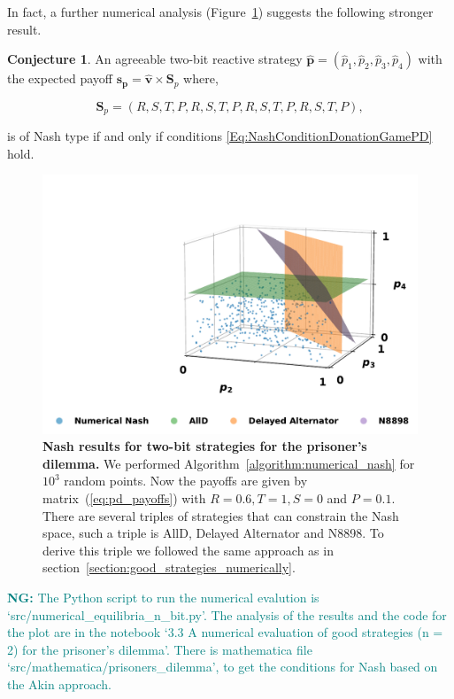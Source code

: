 \documentclass{article}
\theoremstyle{definition}
\newtheorem{conjecture}[theorem]{Conjecture}
\newcommand{\nikoleta}[1]{\textcolor{teal}{{\bf NG:} #1}}
\begin{document}
In fact, a further numerical analysis (Figure~\ref{fig:numerical_results_prisoners_dilemma}) suggests the following stronger result. 

\begin{conjecture}\label{conjecture:nash_from_numerical_results_pd}
An agreeable two-bit reactive strategy \(\mathbf{\hat{p}} = (\hat{p}_{1}, \hat{p}_{2}, \hat{p}_{3}, \hat{p}_{4})\)
with the expected payoff \(\mathbf{s_{p}} = \mathbf{\hat{v}} \times \mathbf{S}_{p}\) where,

\[\mathbf{S}_{p} = (R, S, T, P, R, S, T, P, R, S, T, P, R, S, T, P),\]

is of Nash type if and only if conditions \eqref{Eq:NashConditionDonationGamePD} hold.
\end{conjecture}

\begin{figure}[!htbp]
  \centering
  \includegraphics[width=.55\textwidth]{static/two_bit_reactive_numerical_results_prisoners_dilemma.pdf}
  \caption{\textbf{Nash results for two-bit strategies for the prisoner's dilemma.}
  We performed Algorithm~\ref{algorithm:numerical_nash} for \(10 ^ 3\) random
  points. Now the payoffs are given by matrix~(\ref{eq:pd_payoffs})
  with \(R=0.6, T=1, S=0\) and \(P=0.1\). There are several triples of
  strategies that can constrain the Nash space, such a triple is AllD, Delayed
  Alternator and N8898. To derive this triple we followed the same approach as
  in section~\ref{section:good_strategies_numerically}.}
  \label{fig:numerical_results_prisoners_dilemma}
\end{figure}

\nikoleta{The Python script to run the numerical evalution is
`src/numerical\_equilibria\_n\_bit.py'. The analysis of the results and the code
for the plot are in the notebook `3.3 A numerical evaluation of good strategies
(n = 2) for the prisoner's dilemma'. There is mathematica file
`src/mathematica/prisoners\_dilemma', to get the conditions for Nash based on
the Akin approach.}
\end{document}
